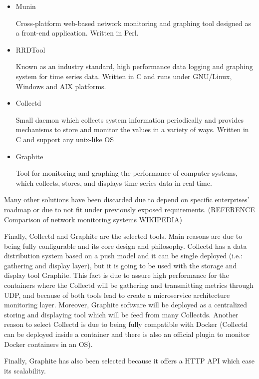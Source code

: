 \begin{itemize}
\item Munin \hfill

Cross-platform web-based network monitoring and graphing tool designed as a front-end application. Written in Perl.

\item RRDTool \hfill

Known as an industry standard, high performance data logging and graphing system for time series data. Written in C and runs under GNU/Linux, Windows and AIX platforms.

\item Collectd \hfill

Small daemon which collects system information periodically and provides mechanisms to store and monitor the values in a variety of ways. Written in C and support any unix-like OS

\item Graphite \hfill

Tool for monitoring and graphing the performance of computer systems, which collects, stores, and displays time series data in real time.

\end{itemize}

Many other solutions have been discarded due to depend on specific enterprises' roadmap or due to not fit under previously exposed requirements. (REFERENCE Comparison of network monitoring systems WIKIPEDIA) 

Finally, Collectd and Graphite are the selected tools. Main reasons are due to being fully configurable and its core design and philosophy. Collectd has a data distribution system based on a push model and it can be single deployed (i.e.: gathering and display layer), but it is going to be used with the storage and display tool Graphite. This fact is due to assure high performance for the containers where the Collectd will be gathering and transmitting metrics through UDP, and because of both tools lead to create a microservice architecture monitoring layer. Moreover, Graphite software will be deployed as a centralized storing and displaying tool which will be feed from many Collectds. Another reason to select Collectd is due to being fully compatible with Docker (Collectd can be deployed inside a container and there is also an official plugin to monitor Docker containers in an OS). 

Finally, Graphite has also been selected because it offers a HTTP API which ease its scalability. 

